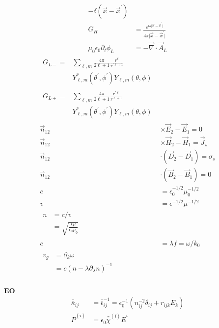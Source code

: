 \documentclass[12pt]{article}
\begin{document}
\begin{multicols}{3}
\begin{align}
  -\delta(\vec{x} - \vec{x}^{\prime})\\
  G_H &= \frac{e^{ik\lvert \vec{x}
      - \vec{x}^{\prime} \rvert}}{4\pi \lvert \vec{x} - \vec{x}^{\prime} \rvert}\\
  \mu_0 \epsilon_0 \partial_t \phi_L &= -\vec{\nabla} \cdot \vec{A}_L
\end{align}
\begin{align}
  \begin{split}
    G_{L-} = &\textstyle{\sum\limits_{\ell, m}} {}\frac{4\pi}{2\ell + 1}
    \frac{r^{\ell}}{r^{\prime \ell + 1}}\\
  &Y^{*}_{\ell, m}(\theta^{\prime}, \phi^{\prime})
  Y_{\ell, m}(\theta, \phi)
  \end{split}\\
  \begin{split}
  G_{L+} = &{}\textstyle{\sum\limits_{\ell, m}}
  \frac{4\pi}{2\ell + 1} \frac{r^{\prime \ell}}{r^{\ell + 1}}\\
  &Y^{*}_{\ell, m}(\theta^{\prime}, \phi^{\prime})
  Y_{\ell, m}(\theta, \phi)
  \end{split}\\
  \vec{n}_{12} &\times {\vec{E}_2 - \vec{E}_1} = 0\\
  \vec{n}_{12} &\times {\vec{H}_2 - \vec{H}_1} = \vec{J}_s\\
  \vec{n}_{12} &\cdot (\vec{D}_2 - \vec{D}_1) = \sigma_s\\
  \vec{n}_{12} &\cdot (\vec{B}_2 - \vec{B}_1) = 0\\
  c &= \epsilon^{-1/2}_0\mu^{-1/2}_0\\
  v &= \epsilon^{-1/2}\mu^{-1/2}\\
  \begin{split}
    n &= c/v\\
    &= \sqrt{\frac{\epsilon\mu}{\epsilon_0\mu_0}}
  \end{split}\\
  c &= \lambda f = \omega/k_0\\
  \begin{split}
    v_g &{}= \partial_k \omega\\
    &= c (n - \lambda \partial_{\lambda} n)^{-1}
  \end{split}\\
\end{align}

\textbf{EO}
\begin{align}
    \bar{\bar{\kappa}}_{ij} &= \bar{\bar{\epsilon}}_{ij}^{-1} = \epsilon_0^{-1} (n_{ij}^{-2} \delta_{ij} + r_{ijk} E_k)\\ %
    \bar{P}^{(i)} &= \epsilon_0 \bar{\bar{\chi}}^{(i)} \bar{E}^{i}
\end{align}


\end{multicols}
\end{document}
